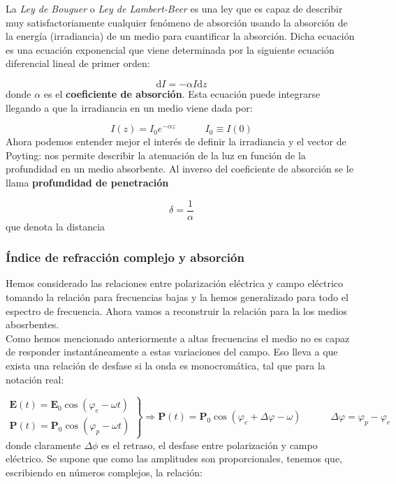 \documentclass[12pt]{article}
\newcommand{\D}{\mathrm{d}}
\newcommand{\tquad}{\quad \quad \quad}
\newcommand{\En}{\mathbf{E}}
\newcommand{\Pn}{\mathbf{P}}
\numberwithin{equation}{section}
\numberwithin{figure}{section}
\begin{document}
La \textit{Ley de Bouguer} o \textit{Ley de Lambert-Beer} es una ley que es capaz de describir muy satisfactoriamente cualquier fenómeno de absorción usando la absorción de la energía (irradiancia) de un medio para cuantificar la absorción. Dicha ecuación es una ecuación exponencial que viene determinada por la siguiente ecuación diferencial lineal de primer orden:

\begin{equation}
\D I = - \alpha I \D z
\end{equation}
donde $\alpha$ es el \textbf{coeficiente de absorción}. Esta ecuación puede integrarse llegando a que la irradiancia en un medio viene dada por:

\begin{equation}
I(z) = I_0 e^{- \alpha z} \tquad I_0 \equiv I (0)
\end{equation}
Ahora podemos entender mejor el interés de definir la irradiancia y el vector de Poyting: nos permite describir la atenuación  de la luz en función de la profundidad en un medio absorbente. Al inverso del coeficiente de absorción se le llama \textbf{profundidad de penetración} 

\begin{equation}
\delta = \dfrac{1}{\alpha}
\end{equation}
que denota la distancia 

\subsubsection{Índice de refracción complejo y absorción}

Hemos considerado las relaciones entre polarización eléctrica y campo eléctrico tomando la relación para frecuencias bajas y la hemos generalizado para todo el espectro de frecuencia. Ahora vamos a reconstruir la relación para la los medios abosrbentes. \\

Como hemos mencionado anteriormente a altas frecuencias el medio no es capaz de responder instantáneamente a estas variaciones del campo. Eso lleva a que exista una relación de desfase si la onda es monocromática, tal que para la notación real:

\begin{equation} 
\left.
\begin{array}{l}
\En (t) = \En_0 \cos (\varphi_e - \omega t) \\
\Pn (t) = \Pn_0 \cos (\varphi_p - \omega t) 
\end{array} \right\rbrace \Longrightarrow \Pn (t) = \Pn_0 \cos (\varphi_e + \Delta \varphi - \omega ) \tquad \Delta \varphi = \varphi_p - \varphi_e
\end{equation}
donde claramente $\Delta \phi$ es el retraso, el desfase entre polarización y campo eléctrico. Se supone que como las amplitudes son proporcionales, tenemos que, escribiendo en números complejos, la relación:
\end{document}
